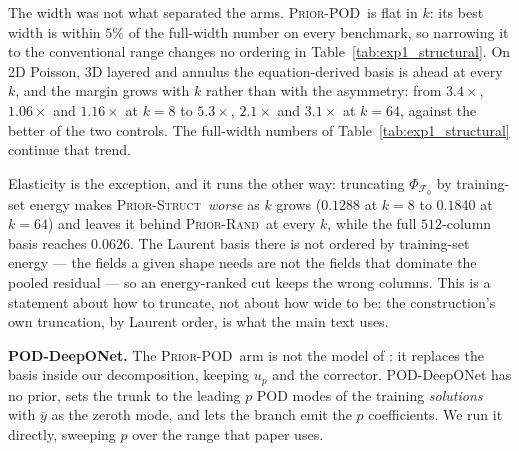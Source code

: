 \documentclass{article}
\newcommand{\armstruct}{\textsc{Prior-Struct}}
\newcommand{\armrand}{\textsc{Prior-Rand}}
\newcommand{\armpod}{\textsc{Prior-POD}}
\begin{document}
The width was not what separated the arms. \armpod\ is flat in $k$: its best width is within
$5\%$ of the full-width number on every benchmark, so narrowing it to the conventional range
changes no ordering in Table~\ref{tab:exp1_structural}. On 2D Poisson, 3D layered and annulus the
equation-derived basis is ahead at every $k$, and the margin grows with $k$ rather than with the
asymmetry: from $3.4\times$, $1.06\times$ and $1.16\times$ at $k{=}8$ to $5.3\times$, $2.1\times$
and $3.1\times$ at $k{=}64$, against the better of the two controls. The full-width numbers of
Table~\ref{tab:exp1_structural} continue that trend.

Elasticity is the exception, and it runs the other way: truncating $\Phi_{\mathcal{F}_0}$ by
training-set energy makes \armstruct\ \emph{worse} as $k$ grows ($0.1288$ at $k{=}8$ to $0.1840$
at $k{=}64$) and leaves it behind \armrand\ at every $k$, while the full $512$-column basis
reaches $0.0626$. The Laurent basis there is not ordered by training-set energy --- the fields a
given shape needs are not the fields that dominate the pooled residual --- so an energy-ranked
cut keeps the wrong columns. This is a statement about how to truncate, not about how wide to
be: the construction's own truncation, by Laurent order, is what the main text uses.

\textbf{POD-DeepONet.} The \armpod\ arm is not the model of \citet{lu2022}: it replaces the
basis inside our decomposition, keeping $u_p$ and the corrector. POD-DeepONet has no prior, sets
the trunk to the leading $p$ POD modes of the training \emph{solutions} with $\bar y$ as the
zeroth mode, and lets the branch emit the $p$ coefficients. We run it directly, sweeping $p$ over
the range that paper uses.
\end{document}
